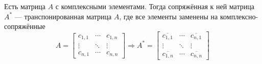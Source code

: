 \begin{definition}
    Есть матрица $A$ с комплексными элементами. Тогда сопряжённая к ней матрица
    $A^*$ --- транспонированная матрица $A$, где все элементы заменены на
    комплексно-сопряжённые
    $$A =
    \begin{bmatrix}
        c_{1,1} & \cdots & c_{1,n} \\
        \vdots & \ddots & \vdots \\
        c_{n,1} & \cdots & c_{n,n}
    \end{bmatrix}
        \Rightarrow
    A^* = 
    \begin{bmatrix}
        \overline{c_{1,1}} & \cdots & \overline{c_{n,1}} \\
        \vdots & \ddots & \vdots \\
        \overline{c_{1,n}} & \cdots & \overline{c_{n,n}}
    \end{bmatrix}$$
\end{definition}


